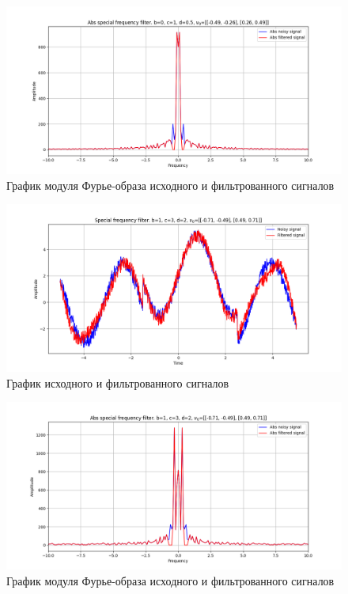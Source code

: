 \documentclass[a4paper, 12pt]{article}
\begin{document}
    \begin{figure}[!htb]
        \centering
        \includegraphics[scale=0.485]{3_abs_u_U_nospec.png}
        \captionsetup{skip=0pt}
        \caption{График модуля Фурье-образа исходного и фильтрованного сигналов}
        \label{fig:fig84}
    \end{figure}
    \begin{figure}[!htb]
        \centering
        \includegraphics[scale=0.485]{4_u_flt_u_nospec.png}
        \captionsetup{skip=0pt}
        \caption{График исходного и фильтрованного сигналов}
        \label{fig:fig85}
    \end{figure}
    \begin{figure}[!htb]
        \centering
        \includegraphics[scale=0.485]{4_abs_u_U_nospec.png}
        \captionsetup{skip=0pt}
        \caption{График модуля Фурье-образа исходного и фильтрованного сигналов}
        \label{fig:fig86}
    \end{figure}
\end{document}
